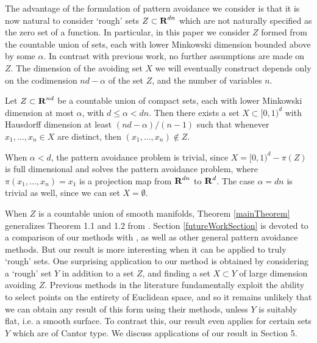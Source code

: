 The advantage of the formulation of pattern avoidance we consider is that it is now natural to consider `rough' sets $Z \subset \operatorname{\mathbf{R}}^{dn}$ which are not naturally specified as the zero set of a function. In particular, in this paper we consider $Z$ formed from the countable union of sets, each with lower Minkowski dimension bounded above by some $\alpha$. In contrast with previous work, no further assumptions are made on $Z$. The dimension of the avoiding set $X$ we will eventually construct depends only on the codimension $nd - \alpha$ of the set $Z$, and the number of variables $n$.

\begin{theorem}\label{mainTheorem}
	Let $Z \subset \operatorname{\mathbf{R}}^{nd}$ be a countable union of compact sets, each with lower Minkowski dimension at most $\alpha$, with $d \leq \alpha < dn$. Then there exists a set $X \subset [0,1)^d$ with Hausdorff dimension at least $(nd - \alpha)/(n-1)$ such that whenever $x_1, \dots, x_n \in X$ are distinct, then $(x_1, \dots, x_n) \not \in Z$.
\end{theorem}

\begin{remark}
	When $\alpha < d$, the pattern avoidance problem is trivial, since $X = [0,1)^d - \pi(Z)$ is full dimensional and solves the pattern avoidance problem, where $\pi(x_1, \dots, x_n) = x_1$ is a projection map from $\operatorname{\mathbf{R}}^{dn}$ to $\operatorname{\mathbf{R}}^d$. The case $\alpha = dn$ is trivial as well, since we can set $X = \emptyset$.

\end{remark}


When $Z$ is a countable union of smooth manifolds, Theorem \ref{mainTheorem} generalizes Theorem 1.1 and 1.2 from \cite{MalabikaRob}. Section \ref{futureWorkSection} is devoted to a comparison of our methods with \cite{MalabikaRob}, as well as other general pattern avoidance methods. But our result is more interesting when it can be applied to truly `rough' sets. One surprising application to our method is obtained by considering a `rough' set $Y$ in addition to a set $Z$, and finding a set $X \subset Y$ of large dimension avoiding $Z$. Previous methods in the literature fundamentally exploit the ability to select points on the entirety of Euclidean space, and so it remains unlikely that we can obtain any result of this form using their methods, unless $Y$ is suitably flat, i.e. a smooth surface. To contrast this, our result even applies for certain sets $Y$ which are of Cantor type. We discuss applications of our result in Section 5.

